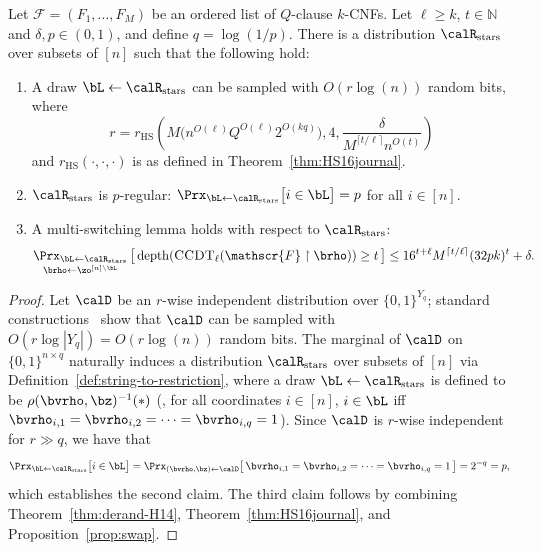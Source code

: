 \documentclass{toc}
\theoremstyle{plain}
\newcommand{\uhr}{\upharpoonright}
\newcommand{\CCDT}{\textsc{CCDT}}
\newcommand{\depth}{\mathrm{depth}}
\newcommand{\stars}{\mathrm{stars}}
\renewcommand{\N}{\mathds{N}}
\begin{document}
\begin{lemma} 
\label{lem:PSL} 
Let $\mathscr{F} = (F_1,\ldots,F_M)$ be an ordered list of $Q$-clause $k$-CNFs. Let $\ell \geq k$, $t \in \N$ and $\delta,p \in (0,1)$, and define $q = \log(1/p)$.  There is a distribution $\calR_\stars$ over subsets of $[n]$ such that the following hold: 
\begin{enumerate} 
\item A draw $\bL\leftarrow\calR_\stars$ can be sampled with $O(r\log(n))$ random bits, where 
\[ r = r_{\mathrm{HS}}\left(M\big(n^{O(\ell)}Q^{O(\ell)}  2^{O(kq)}\big), 4, \frac{\delta}{M^{\lceil t/\ell\rceil} n^{O(t)}}\right)\]
and $r_{\mathrm{HS}}(\cdot,\cdot,\cdot)$ is as defined in Theorem~\ref{thm:HS16journal}.  
\item $\calR_\stars$ is $p$-regular:  $\Prx_{\bL\leftarrow\calR_\stars}\big[i\in \bL\big] = p$ for all $i\in [n]$. 
\item A multi-switching lemma holds with respect to $\calR_\stars$: 
 \begin{equation} \mathop{\Prx_{\bL\leftarrow\calR_\stars}}_{\brho\leftarrow\zo^{[n]\setminus \bL}}\big[\,\depth(\CCDT_{\ell}(\mathscr{F}\uhr\brho)) \ge t\,\big] \le 16^{t+\ell}M^{\lceil t/\ell\rceil} (32pk)^t + \delta. \label{eq:failure}
 \end{equation} 
\end{enumerate} 
\end{lemma} 

\begin{proof} 
Let $\calD$ be an $r$-wise independent distribution over $\{0,1\}^{Y_q}$; standard constructions~\cite{ABI86} show that $\calD$ can be sampled with $O(r \log |Y_q|) = O(r\log(n))$ random bits. The marginal of $\calD$ on $\{0,1\}^{n\times q}$ naturally induces a distribution $\calR_\stars$ over subsets of $[n]$ via Definition~\ref{def:string-to-restriction}, where a draw $\bL \leftarrow \calR_\stars$ is defined to be $\rho(\bvrho,\bz)^{-1}(\ast)$ (\ie, for all coordinates $i\in [n]$, $i \in \bL$ iff $\bvrho_{i,1} = \bvrho_{i,2} = \cdots =\bvrho_{i,q} = 1$).  Since $\calD$ is $r$-wise independent for $r \gg q$, we have that 
\[ \Prx_{\bL\leftarrow\calR_\stars}\big[i\in \bL\big]  = \Prx_{(\bvrho,\bz)\leftarrow \calD}\big[ \,\bvrho_{i,1} = \bvrho_{i,2} = \cdots =\bvrho_{i,q} = 1\,\big] =  2^{-q} = p, \] 
which establishes the second claim. The third claim follows by combining Theorem~\ref{thm:derand-H14}, Theorem~\ref{thm:HS16journal}, and Proposition~\ref{prop:swap}. 
\end{proof} 
\end{document}
